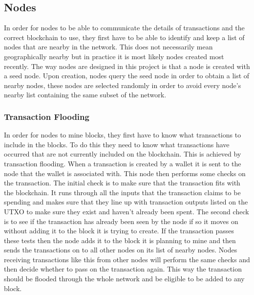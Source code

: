 \documentclass{l4proj}
\begin{document}
\subsection{Nodes}
In order for nodes to be able to communicate the details of transactions and the correct blockchain to use,
they first have to be able to identify and keep a list of nodes that are nearby in the network. This does not
necessarily mean geographically nearby but in practice it is most likely nodes created most recently.
The way nodes are designed in this project is that a node is created with a seed node. Upon creation, nodes
query the seed node in order to obtain a list of nearby nodes, these nodes are selected randomly in order
to avoid every node's nearby list containing the same subset of the network.

\subsubsection{Transaction Flooding}
In order for nodes to mine blocks, they first have to know what transactions to include in the blocks. To do
this they need to know what transactions have occurred that are not currently included on the blockchain. This
is achieved by transaction flooding. When a transaction is created by a wallet it is sent to the node that the
wallet is associated with. This node then performs some checks on the transaction. The initial check is to make
sure that the transaction fits with the blockchain. It runs through all the inputs that the transaction claims
to be spending and makes sure that they line up with transaction outputs listed on the UTXO to make sure they
exist and haven't already been spent. The second check is to see if the transaction has already been seen by
the node if so it moves on without adding it to the block it is trying to create. If the transaction passes
these tests then the node adds it to the block it is planning to mine and then sends the transactions on to all
other nodes on its list of nearby nodes. Nodes receiving transactions like this from other nodes will perform the
same checks and then decide whether to pass on the transaction again. This way the transaction should be flooded
through the whole network and be eligible to be added to any block.
\end{document}
